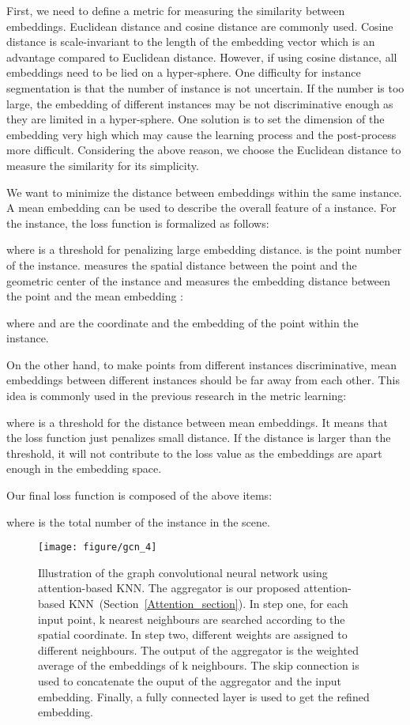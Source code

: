 \documentclass{article}
\begin{document}
First, we need to define a metric for measuring the similarity between embeddings. Euclidean distance and cosine distance are commonly used. Cosine distance is scale-invariant to the length of the embedding vector which is an advantage compared to Euclidean distance. However, if using cosine distance, all embeddings need to be lied on a hyper-sphere. One difficulty for instance segmentation is that the number of instance is not uncertain. If the number is too large, the embedding of different instances may be not discriminative enough as they are limited in a hyper-sphere. One solution is to set the dimension of the embedding very high which may cause the learning process and the post-process more difficult. Considering the above reason, we choose the Euclidean distance to measure the similarity for its simplicity.





We want to minimize the distance between embeddings within the same instance. A mean embedding can be used to describe the overall feature of a instance. For the  instance, the loss function is formalized as follows:

where  is a threshold for penalizing large embedding distance.  is the point number of the  instance.  measures the spatial distance between the  point and the geometric center  of the  instance and  measures the embedding distance between the  point and the mean embedding :


where  and  are the coordinate and the embedding of the  point within the  instance.

On the other hand, to make points from different instances discriminative, mean embeddings between different instances should be far away from each other. This idea is commonly used in the previous research in the metric learning:

where  is a threshold for the distance between mean embeddings. It means that the loss function just penalizes small distance. If the distance is larger than the threshold, it will not contribute to the loss value as the embeddings are apart enough in the embedding space.

Our final loss function is composed of the above items:

where  is the total number of the instance in the scene.


\begin{figure*}[!t]
	\centering
	\texttt{[image: figure/gcn\_4]}
	\caption{Illustration of the graph convolutional neural network using attention-based KNN. The aggregator is our proposed attention-based KNN~(Section~\ref{Attention_section}). In step one, for each input point, k nearest neighbours are searched according to the spatial coordinate. In step two, different weights are assigned to different neighbours. The output of the aggregator is the weighted average of the embeddings of k neighbours. The skip connection is used to concatenate the ouput of the aggregator and the input embedding. Finally, a fully connected layer is used to get the refined embedding.}
	\label{attention}
\end{figure*}
\end{document}
